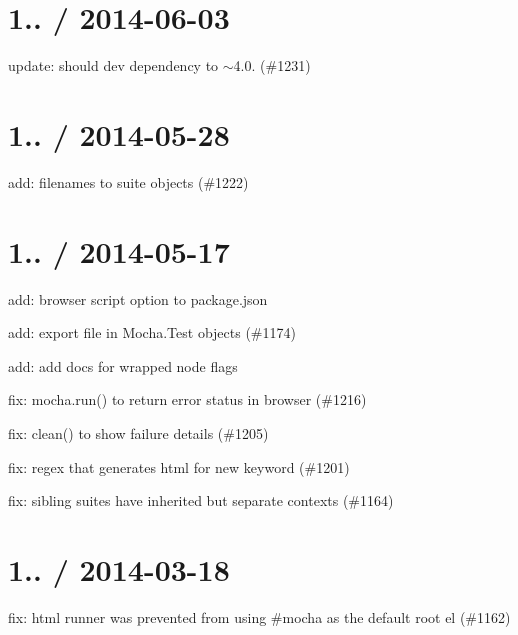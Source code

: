 \section*{1.. / 2014-\/06-\/03}


\begin{DoxyItemize}
\item update\+: should dev dependency to $\sim$4.0. (\#1231)
\end{DoxyItemize}

\section*{1.. / 2014-\/05-\/28}


\begin{DoxyItemize}
\item add\+: filenames to suite objects (\#1222)
\end{DoxyItemize}

\section*{1.. / 2014-\/05-\/17}


\begin{DoxyItemize}
\item add\+: browser script option to package.\+json
\item add\+: export file in Mocha.\+Test objects (\#1174)
\item add\+: add docs for wrapped node flags
\item fix\+: mocha.\+run() to return error status in browser (\#1216)
\item fix\+: clean() to show failure details (\#1205)
\item fix\+: regex that generates html for new keyword (\#1201)
\item fix\+: sibling suites have inherited but separate contexts (\#1164)
\end{DoxyItemize}

\section*{1.. / 2014-\/03-\/18}


\begin{DoxyItemize}
\item fix\+: html runner was prevented from using \#mocha as the default root el (\#1162)
\end{DoxyItemize}

